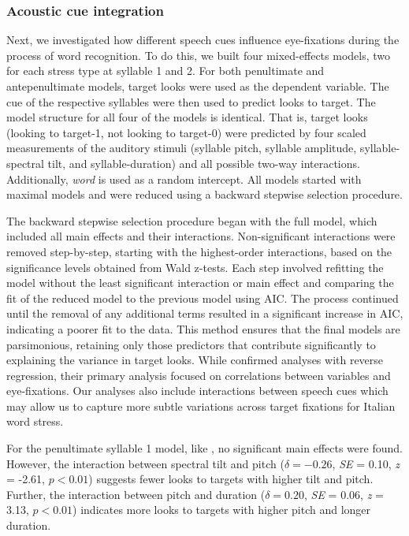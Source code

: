 \subsubsection{Acoustic cue integration}

Next, we investigated how different speech cues influence eye-fixations during the process of word recognition. To do this, we built four mixed-effects models, two for each stress type at syllable 1 and 2. For both penultimate and antepenultimate models, target looks were used as the dependent variable. The cue of the respective syllables were then used to predict looks to target. The model structure for all four of the models is identical. That is, target looks (looking to target-1, not looking to target-0) were predicted by four scaled measurements of the auditory stimuli (syllable pitch, syllable amplitude, syllable-spectral tilt, and syllable-duration) and all possible two-way interactions. Additionally, \textit{word} is used as a random intercept. All models started with maximal models and were reduced using a backward stepwise selection procedure. 

The backward stepwise selection procedure began with the full model, which included all main effects and their interactions. Non-significant interactions were removed step-by-step, starting with the highest-order interactions, based on the significance levels obtained from Wald z-tests. Each step involved refitting the model without the least significant interaction or main effect and comparing the fit of the reduced model to the previous model using AIC. The process continued until the removal of any additional terms resulted in a significant increase in AIC, indicating a poorer fit to the data. This method ensures that the final models are parsimonious, retaining only those predictors that contribute significantly to explaining the variance in target looks. While \cite{Sulpizio_McQueen_2012} confirmed analyses with reverse regression, their primary analysis focused on correlations between variables and eye-fixations. Our analyses also include interactions between speech cues which may allow us to capture more subtle variations across target fixations for Italian word stress.

For the penultimate syllable 1 model, like \cite{Sulpizio_McQueen_2012}, no significant main effects were found. However, the interaction between spectral tilt and pitch ($\delta = -0.26$, \textit{SE} = 0.10, \textit{z} = -2.61, $p < 0.01$) suggests fewer looks to targets with higher tilt and pitch. Further, the interaction between pitch and duration ($\delta = 0.20$, \textit{SE} = 0.06, \textit{z} = 3.13, $p < 0.01$) indicates more looks to targets with higher pitch and longer duration.

